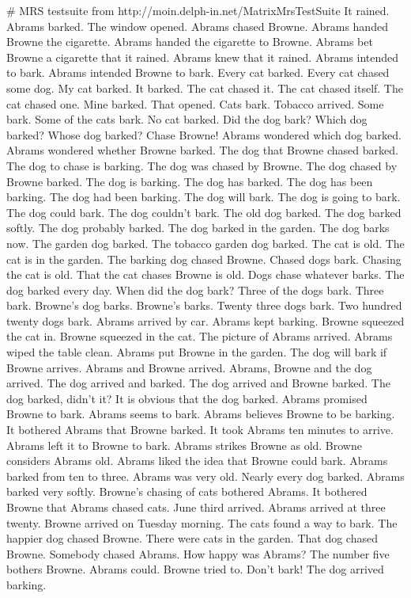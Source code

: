 # MRS testsuite from http://moin.delph-in.net/MatrixMrsTestSuite
It rained.
Abrams barked.
The window opened.
Abrams chased Browne.
Abrams handed Browne the cigarette.
Abrams handed the cigarette to Browne.
Abrams bet Browne a cigarette that it rained.
Abrams knew that it rained.
Abrams intended to bark.
Abrams intended Browne to bark.
Every cat barked.
Every cat chased some dog.
My cat barked.
It barked.
The cat chased it.
The cat chased itself.
The cat chased one.
Mine barked.
That opened.
Cats bark.
Tobacco arrived.
Some bark.
Some of the cats bark.
No cat barked.
Did the dog bark?
Which dog barked?
Whose dog barked?
Chase Browne!
Abrams wondered which dog barked.
Abrams wondered whether Browne barked.
The dog that Browne chased barked.
The dog to chase is barking.
The dog was chased by Browne.
The dog chased by Browne barked.
The dog is barking.
The dog has barked.
The dog has been barking.
The dog had been barking.
The dog will bark.
The dog is going to bark.
The dog could bark.
The dog couldn't bark.
The old dog barked.
The dog barked softly.
The dog probably barked.
The dog barked in the garden.
The dog barks now.
The garden dog barked.
The tobacco garden dog barked.
The cat is old.
The cat is in the garden.
The barking dog chased Browne.
Chased dogs bark.
Chasing the cat is old.
That the cat chases Browne is old.
Dogs chase whatever barks.
The dog barked every day.
When did the dog bark?
Three of the dogs bark.
Three bark.
Browne's dog barks.
Browne's barks.
Twenty three dogs bark.
Two hundred twenty dogs bark.
Abrams arrived by car.
Abrams kept barking.
Browne squeezed the cat in.
Browne squeezed in the cat.
The picture of Abrams arrived.
Abrams wiped the table clean.
Abrams put Browne in the garden.
The dog will bark if Browne arrives.
Abrams and Browne arrived.
Abrams, Browne and the dog arrived.
The dog arrived and barked.
The dog arrived and Browne barked.
The dog barked, didn't it?
It is obvious that the dog barked.
Abrams promised Browne to bark.
Abrams seems to bark.
Abrams believes Browne to be barking.
It bothered Abrams that Browne barked.
It took Abrams ten minutes to arrive.
Abrams left it to Browne to bark.
Abrams strikes Browne as old.
Browne considers Abrams old.
Abrams liked the idea that Browne could bark.
Abrams barked from ten to three.
Abrams was very old.
Nearly every dog barked.
Abrams barked very softly.
Browne's chasing of cats bothered Abrams.
It bothered Browne that Abrams chased cats.
June third arrived.
Abrams arrived at three twenty.
Browne arrived on Tuesday morning.
The cats found a way to bark.
The happier dog chased Browne.
There were cats in the garden.
That dog chased Browne.
Somebody chased Abrams.
How happy was Abrams?
The number five bothers Browne.
Abrams could.
Browne tried to.
Don't bark!
The dog arrived barking.